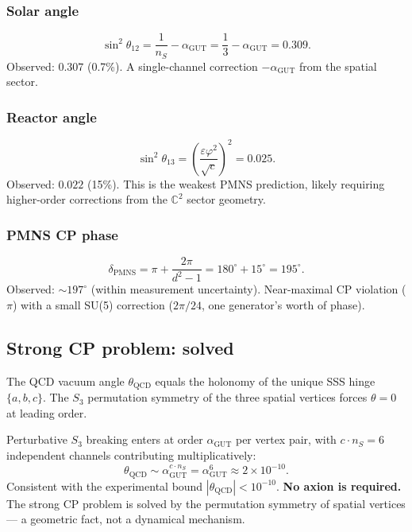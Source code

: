 \subsubsection{Solar angle}
\begin{equation}
\sin^2\theta_{12} = \frac{1}{n_S} - \alpha_\text{GUT} = \frac{1}{3} - \alpha_\text{GUT} = 0.309.
\end{equation}
Observed: $0.307$ (0.7\%). A single-channel correction $-\alpha_\text{GUT}$ from the spatial sector.

\subsubsection{Reactor angle}
\begin{equation}
\sin^2\theta_{13} = \left(\frac{\varepsilon\varphi^2}{\sqrt{c}}\right)^2 = 0.025.
\end{equation}
Observed: $0.022$ (15\%). This is the weakest PMNS prediction, likely requiring higher-order corrections from the $\mathbb{C}^2$ sector geometry.

\subsubsection{PMNS CP phase}
\begin{equation}
\delta_\text{PMNS} = \pi + \frac{2\pi}{d^2 - 1} = 180^\circ + 15^\circ = 195^\circ.
\end{equation}
Observed: $\sim 197^\circ$ (within measurement uncertainty). Near-maximal CP violation ($\pi$) with a small SU(5) correction ($2\pi/24$, one generator's worth of phase).

\subsection{Strong CP problem: solved}

The QCD vacuum angle $\theta_\text{QCD}$ equals the holonomy of the unique SSS hinge $\{a, b, c\}$. The $S_3$ permutation symmetry of the three spatial vertices forces $\theta = 0$ at leading order.

Perturbative $S_3$ breaking enters at order $\alpha_\text{GUT}$ per vertex pair, with $c \cdot n_S = 6$ independent channels contributing multiplicatively:
\begin{equation}
\theta_\text{QCD} \sim \alpha_\text{GUT}^{c \cdot n_S} = \alpha_\text{GUT}^6 \approx 2 \times 10^{-10}.
\end{equation}
Consistent with the experimental bound $|\theta_\text{QCD}| < 10^{-10}$. \textbf{No axion is required.} The strong CP problem is solved by the permutation symmetry of spatial vertices --- a geometric fact, not a dynamical mechanism.

